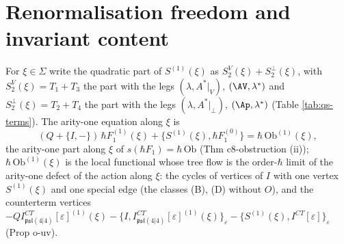 \section{Renormalisation freedom and invariant content}
\label{sec:qs-freedom}

\begin{definition}
\label{def:qs-Fxi}
For $\xi\in\Sigma$ write the quadratic part of $S^{(1)}(\xi)$ as $S^V_2(\xi)+S^\perp_2(\xi)$, with $S^V_2(\xi)=T_1+T_3$ the part with the legs $(\lambda,A^*|_V)$, $(\AV,\lambda^*)$ and $S^\perp_2(\xi)=T_2+T_4$ the part with the legs $(\lambda,A^*|_\perp)$, $(\Ap,\lambda^*)$ (Table \ref{tab:qs-terms}). The arity-one equation along $\xi$ is
\begin{equation}
(Q+\{I,-\})\,\hbar F_1^{(1)}(\xi)+\big\{S^{(1)}(\xi),\hbar F_1^{(0)}\big\}=\hbar\,\mathrm{Ob}^{(1)}(\xi),
\label{eq:qs-arity1xi}
\end{equation}
the arity-one part along $\xi$ of $s(\hbar F_1)=\hbar\,\mathrm{Ob}$ (Thm c8-obstruction (ii)); $\hbar\,\mathrm{Ob}^{(1)}(\xi)$ is the local functional whose tree flow is the order-$\hbar$ limit of the arity-one defect of the action along $\xi$: the cycles of vertices of $I$ with one vertex $S^{(1)}(\xi)$ and one special edge (the classes (B), (D) without $O$), and the counterterm vertices $-QI^{CT}_{\mathfrak{psl}(4|4)}[\varepsilon]^{(1)}(\xi)-\{I,I^{CT}_{\mathfrak{psl}(4|4)}[\varepsilon]^{(1)}(\xi)\}_\varepsilon-\{S^{(1)}(\xi),I^{CT}[\varepsilon]\}_\varepsilon$ (Prop o-uv).
\end{definition}

